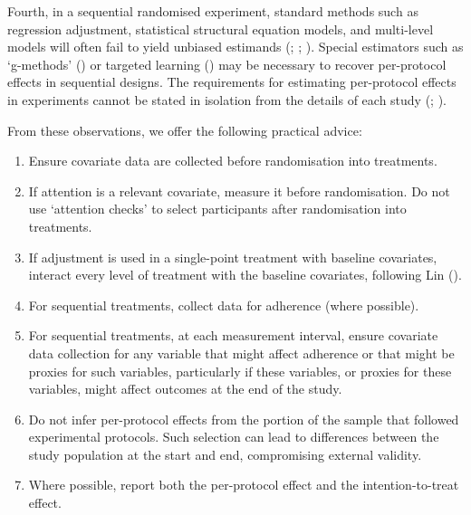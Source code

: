 \documentclass[
  single column]{article}
\providecommand{\tightlist}{%
  \setlength{\itemsep}{0pt}\setlength{\parskip}{0pt}}\usepackage{longtable,booktabs,array}
\begin{document}
Fourth, in a sequential randomised experiment, standard methods such as
regression adjustment, statistical structural equation models, and
multi-level models will often fail to yield unbiased estimands
(;
;
).
Special estimators such as `g-methods'
() or targeted
learning () may
be necessary to recover per-protocol effects in sequential designs. The
requirements for estimating per-protocol effects in experiments cannot
be stated in isolation from the details of each study
(;
).

From these observations, we offer the following practical advice:

\begin{enumerate}
\def\labelenumi{\arabic{enumi}.}
\tightlist
\item
  Ensure covariate data are collected before randomisation into
  treatments.
\item
  If attention is a relevant covariate, measure it before randomisation.
  Do not use `attention checks' to select participants after
  randomisation into treatments.
\item
  If adjustment is used in a single-point treatment with baseline
  covariates, interact every level of treatment with the baseline
  covariates, following Lin
  ().
\item
  For sequential treatments, collect data for adherence (where
  possible).
\item
  For sequential treatments, at each measurement interval, ensure
  covariate data collection for any variable that might affect adherence
  or that might be proxies for such variables, particularly if these
  variables, or proxies for these variables, might affect outcomes at
  the end of the study.
\item
  Do not infer per-protocol effects from the portion of the sample that
  followed experimental protocols. Such selection can lead to
  differences between the study population at the start and end,
  compromising external validity.
\item
  Where possible, report both the per-protocol effect and the
  intention-to-treat effect.
\end{enumerate}
\end{document}
